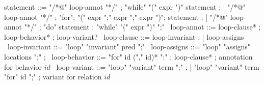 \begin{syntax}
  statement ::= "/*@" loop-annot "*/" ;
  "while" "(" expr ")" statement ;
  | "/*@" loop-annot "*/" ;
  "for";
  "(" expr ";" expr ";" expr ")";
  statement ;
  | "/*@" loop-annot "*/" ;
  "do" statement ;
  "while" "(" expr ")" ";"
  \
  loop-annot ::= loop-clause* ;
  loop-behavior* ;
  loop-variant?
  \
  loop-clause ::= loop-invariant ;
                | loop-assigns 
  \
  loop-invariant ::= "loop" "invariant" pred ";" 
  \
  loop-assigns ::= "loop" 
                   "assigns" locations ";" ;
  \
  loop-behavior ::= "for" id ("," id)* ":" ;
  loop-clause* ; annotation for behavior $id$
  \
  loop-variant ::= "loop" "variant" term ";" ;
  | "loop" "variant" term "for" id ";" ; variant for relation $id$
\end{syntax}
